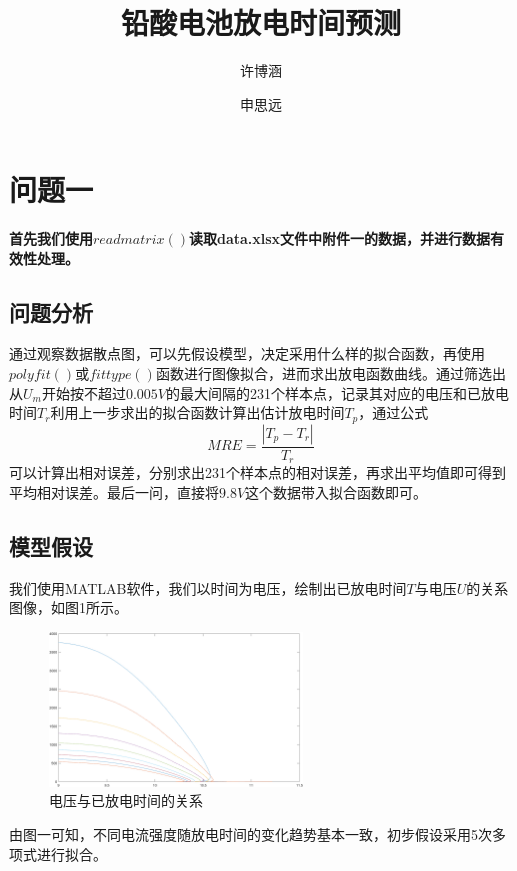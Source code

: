\documentclass[a4paper]{article}
\title{铅酸电池放电时间预测}
\author{许博涵 \and 申思远}
\begin{document}
\maketitle

\section{问题一}\label{sec:big-title}

\paragraph{首先我们使用$readmatrix()$读取data.xlsx文件中附件一的数据，并进行数据有效性处理。}

\subsection{问题分析}
通过观察数据散点图，可以先假设模型，决定采用什么样的拟合函数，再使用$polyfit()$或$fittype()$函数进行图像拟合，进而求出放电函数曲线。通过筛选出从$U_m$开始按不超过$0.005V$的最大间隔的231个样本点，记录其对应的电压和已放电时间$T_r$利用上一步求出的拟合函数计算出估计放电时间$T_p$，通过公式
\begin{equation}\label{eq1}MRE = \frac{{|{T_p} - {T_r}|}}{{{T_r}}}\end{equation}
可以计算出相对误差，分别求出231个样本点的相对误差，再求出平均值即可得到平均相对误差。最后一问，直接将$9.8V$这个数据带入拟合函数即可。
\subsection{模型假设}
我们使用MATLAB软件，我们以时间为电压，绘制出已放电时间$T$与电压$U$的关系图像，如图1所示。
\begin{figure}[htbp]
    \centering
    \includegraphics[width = 0.6\textwidth]{img/1.png}
    \caption{电压与已放电时间的关系}
\end{figure}

由图一可知，不同电流强度随放电时间的变化趋势基本一致，初步假设采用5次多项式进行拟合。
\end{document}
